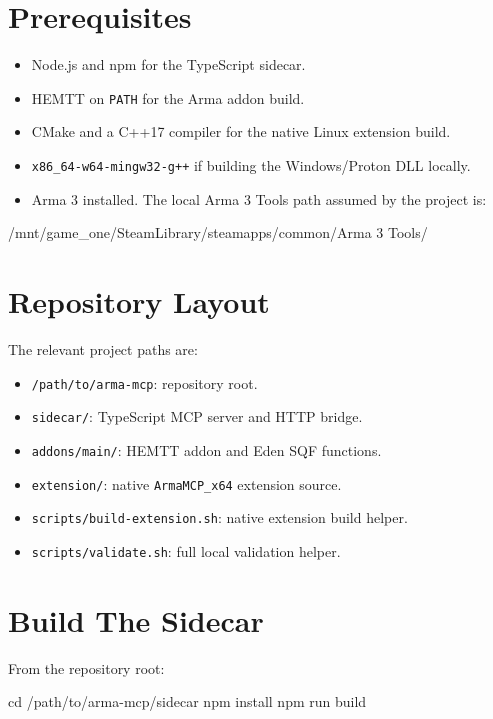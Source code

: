 \documentclass[11pt]{article}
\newcommand{\code}[1]{\texttt{#1}}
\newcommand{\projectroot}{\code{/path/to/arma-mcp}}
\begin{document}
\section{Prerequisites}

\begin{itemize}
  \item Node.js and npm for the TypeScript sidecar.
  \item HEMTT on \code{PATH} for the Arma addon build.
  \item CMake and a C++17 compiler for the native Linux extension build.
  \item \code{x86\_64-w64-mingw32-g++} if building the Windows/Proton DLL locally.
  \item Arma 3 installed. The local Arma 3 Tools path assumed by the project is:
\end{itemize}

\begin{commandblock}
/mnt/game_one/SteamLibrary/steamapps/common/Arma 3 Tools/
\end{commandblock}

\section{Repository Layout}

The relevant project paths are:

\begin{itemize}
  \item \projectroot{}: repository root.
  \item \code{sidecar/}: TypeScript MCP server and HTTP bridge.
  \item \code{addons/main/}: HEMTT addon and Eden SQF functions.
  \item \code{extension/}: native \code{ArmaMCP\_x64} extension source.
  \item \code{scripts/build-extension.sh}: native extension build helper.
  \item \code{scripts/validate.sh}: full local validation helper.
\end{itemize}

\section{Build The Sidecar}

From the repository root:

\begin{commandblock}
cd /path/to/arma-mcp/sidecar
npm install
npm run build
\end{commandblock}
\end{document}
